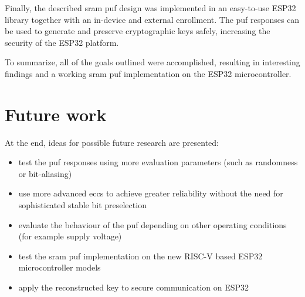 Finally, the described \gls{sram} \gls{puf} design was implemented in an easy-to-use ESP32 library together with an in-device and external enrollment. The \gls{puf} responses can be used to generate and preserve cryptographic keys safely, increasing the security of the ESP32 platform.

To summarize, all of the goals outlined were accomplished, resulting in interesting findings and a working \gls{sram} \gls{puf} implementation on the ESP32 microcontroller.

\pagebreak

\section*{Future work}
{}

At the end, ideas for possible future research are presented:
\begin{itemize}
    \item test the \gls{puf} responses using more evaluation parameters (such as randomness or bit-aliasing)
    \item use more advanced \glspl{ecc} to achieve greater reliability without the need for sophisticated stable bit preselection
    \item evaluate the behaviour of the \gls{puf} depending on other operating conditions (for example supply voltage)
    \item test the \gls{sram} \gls{puf} implementation on the new RISC-V based ESP32 microcontroller models
    \item apply the reconstructed key to secure communication on ESP32
\end{itemize}

